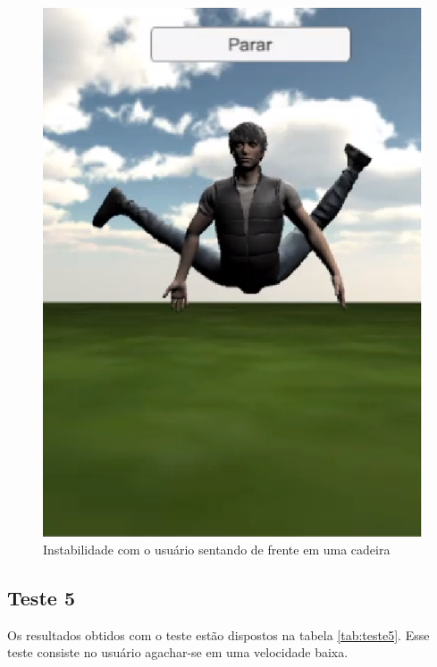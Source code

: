 \begin{figure}[H]
\centering
\includegraphics [keepaspectratio=true,scale=0.60]{figuras/cadeiraFrente.eps}
\caption{Instabilidade com o usuário sentando de frente em uma cadeira}
\label{img:teste4}
\end{figure}

\subsection{Teste 5}\label{sub:teste5}
Os resultados obtidos com o teste estão dispostos na tabela \ref{tab:teste5}. Esse teste consiste no usuário agachar-se em uma velocidade
baixa.


